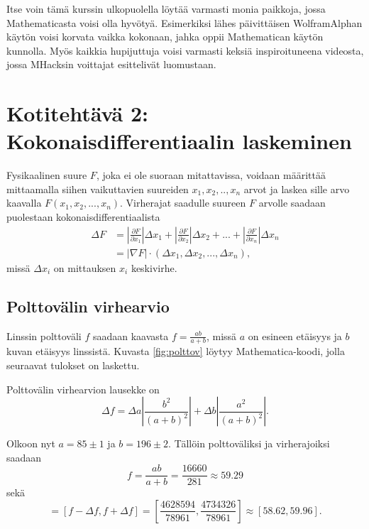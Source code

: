 \documentclass[a4paper,11pt]{article}
\begin{document}
{Itse voin tämä kurssin ulkopuolella löytää varmasti monia paikkoja, jossa Mathematicasta voisi olla hyvötyä. Esimerkiksi lähes päivittäisen Wolfram\-Alphan käytön voisi korvata vaikka kokonaan, jahka oppii Mathematican käytön kunnolla. Myös kaikkia hupijuttuja voisi varmasti keksiä inspiroituneena videosta, jossa MHacksin voittajat esittelivät luomustaan.

\section{Kotitehtävä 2: Kokonaisdifferentiaalin laskeminen}

Fysikaalinen suure $F$, joka ei ole suoraan mitattavissa, voidaan määrittää mittaamalla siihen vaikuttavien suureiden $x_1,x_2,..,x_n$ arvot ja laskea sille arvo kaavalla $F(x_1,x_2,...,x_n)$. Virherajat saadulle suureen $F$ arvolle saadaan puolestaan kokonaisdifferentiaalista
\begin{align}
    \Delta F & = \left\lvert \frac{\partial F}{\partial x_1} \right\rvert \Delta x_1 + \left\lvert \frac{\partial F}{\partial x_2} \right\rvert \Delta x_2 + ... + \left\lvert \frac{\partial F}{\partial x_n} \right\rvert \Delta x_n\\
    & = \lvert \nabla F \rvert \cdot (\Delta x_1, \Delta x_2, ..., \Delta x_n),
\end{align}
missä $\Delta x_i$ on mittauksen $x_i$ keskivirhe.

\subsection{Polttovälin virhearvio}
\label{polttovali}

Linssin polttoväli $f$ saadaan kaavasta $f=\frac{ab}{a+b}$, missä $a$ on esineen etäisyys ja $b$ kuvan etäisyys linssistä. Kuvasta \ref{fig:polttov} löytyy Mathematica-koodi, jolla seuraavat tulokset on laskettu.

Polttovälin virhearvion lausekke on
\begin{equation}
    \Delta f = \Delta a \left\lvert \frac{b^2}{(a+b)^2} \right\rvert + \Delta b \left\lvert \frac{a^2}{(a+b)^2} \right\rvert.
\end{equation}

Olkoon nyt $a=85\pm1$ ja $b=196\pm2$. Tällöin polttoväliksi ja virherajoiksi saadaan
\begin{equation}
    f = \frac{ab}{a+b} = \frac{16660}{281} \approx 59.29
\end{equation}
sekä
\begin{equation}
    [f_{min},f_{max}] = [f-\Delta f, f+\Delta f] = \left[\frac{4628594}{78961}, \frac{4734326}{78961}\right] \approx [58.62, 59.96].
\end{equation}

}
\end{document}
